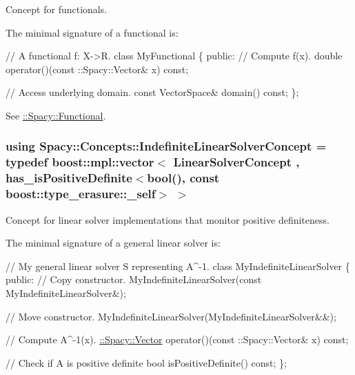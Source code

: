 Concept for functionals. 

\label{group__ConceptGroup_ga5273b50bd3e8c9a3f5a1e6b5f170836d_FunctionalConceptAnchor}%
\hypertarget{group__ConceptGroup_ga5273b50bd3e8c9a3f5a1e6b5f170836d_FunctionalConceptAnchor}{}%
The minimal signature of a functional is\+: 
\begin{DoxyCode}
\textcolor{comment}{// A functional f: X->R.}
\textcolor{keyword}{class }MyFunctional
\{
\textcolor{keyword}{public}:
  \textcolor{comment}{// Compute f(x).}
  \textcolor{keywordtype}{double} operator()(const ::Spacy::Vector& x) \textcolor{keyword}{const};

  \textcolor{comment}{// Access underlying domain.}
  \textcolor{keyword}{const} VectorSpace& domain() \textcolor{keyword}{const};
\};
\end{DoxyCode}


See \hyperlink{group__SpacyGroup_ga673218f603c93790864aef12c89d3a35_FunctionalAnchor}{\+:\+:Spacy\+:\+:Functional}. \hypertarget{group__ConceptGroup_ga582dd34334cdecc7b27883f4e8239490_ga582dd34334cdecc7b27883f4e8239490}{}
\subsubsection[{Indefinite\+Linear\+Solver\+Concept}]{\setlength{\rightskip}{0pt plus 5cm}using {\bf Spacy\+::\+Concepts\+::\+Indefinite\+Linear\+Solver\+Concept} = typedef boost\+::mpl\+::vector$<$ Linear\+Solver\+Concept , has\+\_\+is\+Positive\+Definite$<$bool(), const boost\+::type\+\_\+erasure\+::\+\_\+self$>$ $>$}\label{group__ConceptGroup_ga582dd34334cdecc7b27883f4e8239490_ga582dd34334cdecc7b27883f4e8239490}


Concept for linear solver implementations that monitor positive definiteness. 

\label{group__ConceptGroup_ga582dd34334cdecc7b27883f4e8239490_IndefiniteLinearSolverConceptAnchor}%
\hypertarget{group__ConceptGroup_ga582dd34334cdecc7b27883f4e8239490_IndefiniteLinearSolverConceptAnchor}{}%
The minimal signature of a general linear solver is\+: 
\begin{DoxyCode}
\textcolor{comment}{// My general linear solver S representing A^-1.}
\textcolor{keyword}{class }MyIndefiniteLinearSolver
\{
\textcolor{keyword}{public}:
  \textcolor{comment}{// Copy constructor.}
  MyIndefiniteLinearSolver(\textcolor{keyword}{const} MyIndefiniteLinearSolver&);

  \textcolor{comment}{// Move constructor.}
  MyIndefiniteLinearSolver(MyIndefiniteLinearSolver&&);

  \textcolor{comment}{// Compute A^-1(x).}
  \hyperlink{classSpacy_1_1Vector}{::Spacy::Vector} operator()(const ::Spacy::Vector& x) \textcolor{keyword}{const};

  \textcolor{comment}{// Check if A is positive definite}
  \textcolor{keywordtype}{bool} isPositiveDefinite() \textcolor{keyword}{const};
\};
\end{DoxyCode}


